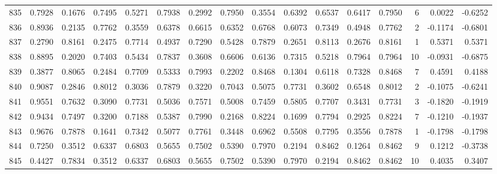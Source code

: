 \begin{tabular}{lrrrrrrrrrrrrrrr}
835 &      0.7928 &  0.1676 &  0.7495 &  0.5271 &  0.7938 &  0.2992 &  0.7950 &  0.3554 &  0.6392 &  0.6537 &   0.6417 &     0.7950 &      6 &                    0.0022 &                    -0.6252 \\
836 &      0.8936 &  0.2135 &  0.7762 &  0.3559 &  0.6378 &  0.6615 &  0.6352 &  0.6768 &  0.6073 &  0.7349 &   0.4948 &     0.7762 &      2 &                   -0.1174 &                    -0.6801 \\
837 &      0.2790 &  0.8161 &  0.2475 &  0.7714 &  0.4937 &  0.7290 &  0.5428 &  0.7879 &  0.2651 &  0.8113 &   0.2676 &     0.8161 &      1 &                    0.5371 &                     0.5371 \\
838 &      0.8895 &  0.2020 &  0.7403 &  0.5434 &  0.7837 &  0.3608 &  0.6606 &  0.6136 &  0.7315 &  0.5218 &   0.7964 &     0.7964 &     10 &                   -0.0931 &                    -0.6875 \\
839 &      0.3877 &  0.8065 &  0.2484 &  0.7709 &  0.5333 &  0.7993 &  0.2202 &  0.8468 &  0.1304 &  0.6118 &   0.7328 &     0.8468 &      7 &                    0.4591 &                     0.4188 \\
840 &      0.9087 &  0.2846 &  0.8012 &  0.3036 &  0.7879 &  0.3220 &  0.7043 &  0.5075 &  0.7731 &  0.3602 &   0.6548 &     0.8012 &      2 &                   -0.1075 &                    -0.6241 \\
841 &      0.9551 &  0.7632 &  0.3090 &  0.7731 &  0.5036 &  0.7571 &  0.5008 &  0.7459 &  0.5805 &  0.7707 &   0.3431 &     0.7731 &      3 &                   -0.1820 &                    -0.1919 \\
842 &      0.9434 &  0.7497 &  0.3200 &  0.7188 &  0.5387 &  0.7990 &  0.2168 &  0.8224 &  0.1699 &  0.7794 &   0.2925 &     0.8224 &      7 &                   -0.1210 &                    -0.1937 \\
843 &      0.9676 &  0.7878 &  0.1641 &  0.7342 &  0.5077 &  0.7761 &  0.3448 &  0.6962 &  0.5508 &  0.7795 &   0.3556 &     0.7878 &      1 &                   -0.1798 &                    -0.1798 \\
844 &      0.7250 &  0.3512 &  0.6337 &  0.6803 &  0.5655 &  0.7502 &  0.5390 &  0.7970 &  0.2194 &  0.8462 &   0.1264 &     0.8462 &      9 &                    0.1212 &                    -0.3738 \\
845 &      0.4427 &  0.7834 &  0.3512 &  0.6337 &  0.6803 &  0.5655 &  0.7502 &  0.5390 &  0.7970 &  0.2194 &   0.8462 &     0.8462 &     10 &                    0.4035 &                     0.3407 \\

\end{tabular}
